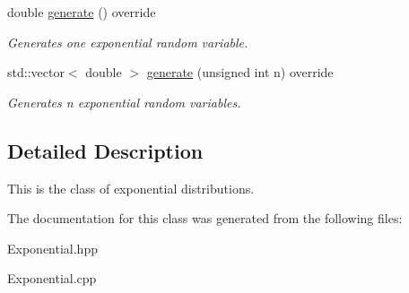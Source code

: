 \begin{DoxyCompactItemize}
\mbox{\label{classExponential_ac7846dc0581e84750960825ad9ce4946}} 
double \hyperlink{classExponential_ac7846dc0581e84750960825ad9ce4946}{generate} () override
\begin{DoxyCompactList}\small\item\em Generates one exponential random variable. \end{DoxyCompactList}\item 
\mbox{\label{classExponential_a76618e620ae5d5c331210fe05ba0054e}} 
std\+::vector$<$ double $>$ \hyperlink{classExponential_a76618e620ae5d5c331210fe05ba0054e}{generate} (unsigned int n) override
\begin{DoxyCompactList}\small\item\em Generates n exponential random variables. \end{DoxyCompactList}\end{DoxyCompactItemize}


\subsection{Detailed Description}
This is the class of exponential distributions. 

The documentation for this class was generated from the following files\+:\begin{DoxyCompactItemize}
\item 
Exponential.\+hpp\item 
Exponential.\+cpp\end{DoxyCompactItemize}
